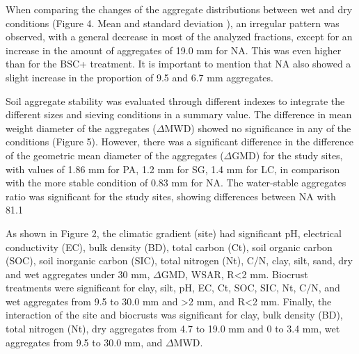 {%

When comparing the changes of the aggregate distributions between wet and dry conditions (Figure 4. Mean and standard deviation ), an irregular pattern was observed, with a general decrease in most of the analyzed fractions, except for an increase in the amount of aggregates of 19.0 mm for NA. This was even higher than for the BSC+ treatment. It is important to mention that NA also showed a slight increase in the proportion of 9.5 and 6.7 mm aggregates.


Soil aggregate stability was evaluated through different indexes to integrate the different sizes and sieving conditions in a summary value. The difference in mean weight diameter of the aggregates ($\Delta$MWD) showed no significance in any of the conditions (Figure 5). However, there was a significant difference in the difference of the geometric mean diameter of the aggregates ($\Delta$GMD) for the study sites, with values of 1.86 mm for PA, 1.2 mm for SG, 1.4 mm for LC, in comparison with the more stable condition of 0.83 mm for NA. The water-stable aggregates ratio was significant for the study sites, showing differences between NA with 81.1%


As shown in Figure 2, the climatic gradient (site) had significant pH, electrical conductivity (EC), bulk density (BD), total carbon (Ct), soil organic carbon (SOC), soil inorganic carbon (SIC), total nitrogen (Nt), C/N, clay, silt, sand, dry and wet aggregates under 30 mm, $\Delta$GMD, WSAR, R<2 mm. Biocrust treatments were significant for clay, silt, pH, EC, Ct, SOC, SIC, Nt, C/N, and wet aggregates from 9.5 to 30.0 mm and >2 mm, and R<2 mm. Finally, the interaction of the site and biocrusts was significant for clay, bulk density (BD), total nitrogen (Nt), dry aggregates from 4.7 to 19.0 mm and 0 to 3.4 mm, wet aggregates from 9.5 to 30.0 mm, and $\Delta$MWD.

}
